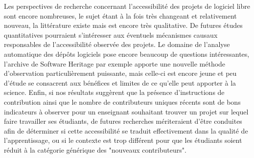 \documentclass[dvipsnames]{llncs}
\begin{document}
    Les perspectives de recherche concernant l'accessibilité des projets de logiciel libre sont encore
    nombreuses, le sujet étant à la fois très changeant et relativement nouveau, la littérature existe mais
    est encore très qualitative. De futures études quantitatives pourraient s'intéresser aux éventuels
    mécanismes causaux responsables de l'accessibilité observée des projets. Le domaine de l'analyse
    automatique des dépôts logiciels pose encore beaucoup de questions intéressantes, l'archive de Software
    Heritage par exemple apporte une nouvelle méthode d'observation particulièrement puissante, mais celle-ci
    est encore jeune et peu d'étude se consacrent aux bénéfices et limites de ce qu'elle peut apporter à la
    science. Enfin, si nos résultats suggèrent que la présence d'instructions de contribution ainsi que le
    nombre de contributeurs uniques récents sont de bons indicateurs à observer pour un enseignant souhaitant
    trouver un projet sur lequel faire travailler ses étudiants, de futures recherches mériteraient d'être
    conduites afin de déterminer si cette accessibilité se traduit effectivement dans la qualité de
    l'apprentissage, ou si le contexte est trop différent pour que les étudiants soient réduit à la catégorie
    générique des "nouveaux contributeurs".

    \printbibliography[heading=bibintoc]
\end{document}
